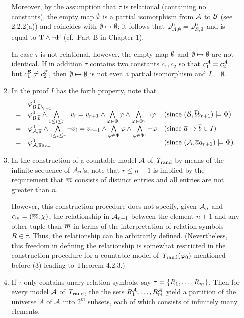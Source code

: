 \begin{enumerate}[1.]
\begin{enumerate}[(1)]
Moreover, by the assumption that $\tau$ is relational (containing no constants), the empty map $\emptyset$ is a partial isomorphism from $\mathcal{A}$ to $\mathcal{B}$ (see 2.2.2(a)) and coincides with $\emptyset \mapsto \emptyset$; it follows that $\varphi^{0}_{\mathcal{A}, \emptyset} = \varphi^{0}_{\mathcal{B}, \emptyset}$ and is equal to $\mathrm{T} \land \neg\mathrm{F}$ (cf.\ Part B in Chapter 1).

In case $\tau$ is not relational, however, the empty map $\emptyset$ and $\emptyset \mapsto \emptyset$ are not identical. If in addition $\tau$ contains two constants $c_1, c_2$ so that $c_1^{\mathcal{A}} = c_2^{\mathcal{A}}$ but $c_1^{\mathcal{B}} \neq c_2^{\mathcal{B}}$, then $\emptyset \mapsto \emptyset$ is not even a partial isomorphism and $I = \emptyset$.
\item In the proof $I$ has the forth property, note that
\[
\begin{array}{lll}
\ & \hint{0}{\strct{B}, \vect{b}b_{r + 1}} & \cr
= & \hint{0}{\strct{B}, \vect{b}} \land \bland\limits_{1 \leq i \leq r} \neg v_i = v_{r + 1} \land \bland\limits_{\varphi \in \Phi} \varphi \land \bland\limits_{\varphi \in \cmpl{\Phi}} \neg\varphi & \text{(since \mathmode{(\strct{B}, \vect{b}b_{r + 1}) \satis \Phi})} \cr
= & \hint{0}{\strct{A}, \vect{a}} \land \bland\limits_{1 \leq i \leq r} \neg v_i = v_{r + 1}\land \bland\limits_{\varphi \in \Phi} \varphi \land \bland\limits_{\varphi \in \cmpl{\Phi}} \neg\varphi & \text{(since \mathmode{\vect{a} \mapsto \vect{b} \in I})} \cr
= & \hint{0}{\strct{A}, \vect{a}a_{r + 1}} & \text{(since \mathmode{(\strct{A}, \vect{a}a_{r + 1}) \satis \Phi})}. \cr
\end{array}
\]
\item In the construction of a countable model $\mathcal{A}$ of $\mathit{T}_{\mathrm{rand}}$ by means of the infinite sequence of $\mathcal{A}_n$'s, note that $r \leq n + 1$ is implied by the requirement that $\overline{m}$ consists of distinct entries and all entries are not greater than $n$.

However, this construction procedure does not specify, given $\mathcal{A}_n$ and $\alpha_n = (\vect{m}, \extaxm)$, the relationship in $\mathcal{A}_{n + 1}$ between the element $n + 1$ and any other tuple than $\overline{m}$ in terms of the interpretation of relation symbols $R \in \tau$. Thus, the relationship can be arbitrarily defined. (Nevertheless, this freedom in defining the relationship is somewhat restricted in the construction procedure for a countable model of $\mathit{T}_{\mathrm{rand}}(\varphi_0)$ mentioned before (3) leading to Theorem 4.2.3.)
\item If $\tau$ only contains unary relation symbols, say $\tau = {\{R_1, \ldots, R_m\}}$. Then for every model $\mathcal{A}$ of $\mathit{T}_{\mathrm{rand}}$, the the sets $R_1^{\mathcal{A}}, \ldots, R_m^{\mathcal{A}}$ yield a partition of the universe $A$ of $\mathcal{A}$ into $2^m$ subsets, each of which consists of infinitely many elements.


\end{enumerate}
\end{enumerate}
